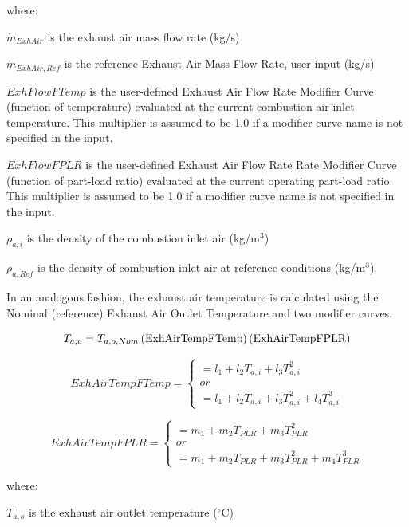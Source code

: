 where:

\({\dot m_{ExhAir}}\) is the exhaust air mass flow rate (kg/s)

\({\dot m_{ExhAir,Ref}}\) is the reference Exhaust Air Mass Flow Rate, user input (kg/s)

\(ExhFlowFTemp\) is the user-defined Exhaust Air Flow Rate Modifier Curve (function of temperature) evaluated at the current combustion air inlet temperature. This multiplier is assumed to be 1.0 if a modifier curve name is not specified in the input.

\(ExhFlowFPLR\) is the user-defined Exhaust Air Flow Rate Rate Modifier Curve (function of part-load ratio) evaluated at the current operating part-load ratio. This multiplier is assumed to be 1.0 if a modifier curve name is not specified in the input.

\({\rho_{a,i}}\) is the density of the combustion inlet air (kg/m\(^{3}\))

\({\rho_{a,Ref}}\) is the density of combustion inlet air at reference conditions (kg/m\(^{3}\)).

In an analogous fashion, the exhaust air temperature is calculated using the Nominal (reference) Exhaust Air Outlet Temperature and two modifier curves.

\begin{equation}
  T_{a,o} = T_{a,o,Nom} \left(\text{ExhAirTempFTemp}\right) \left(\text{ExhAirTempFPLR}\right)
\end{equation}

\begin{equation}
ExhAirTempFTemp = \left\{
  \begin{array}{l}
      = l_1 + l_2 T_{a,i} + l_3 T_{a,i}^2 \\
      or \\
      = l_1 + l_2 T_{a,i} + l_3 T_{a,i}^2 + l_4 T_{a,i}^3
  \end{array}
\right.
\end{equation}

\begin{equation}
ExhAirTempFPLR = \left\{
  \begin{array}{l}
       = m_1 + m_2 T_{PLR} + m_3 T_{PLR}^2 \\
       or \\
       = m_1 + m_2 T_{PLR} + m_3 T_{PLR}^2 + m_4 T_{PLR}^3
  \end{array}
\right.
\end{equation}

where:

\({T_{a,o}}\) is the exhaust air outlet temperature (\(^{\circ}\)C)

